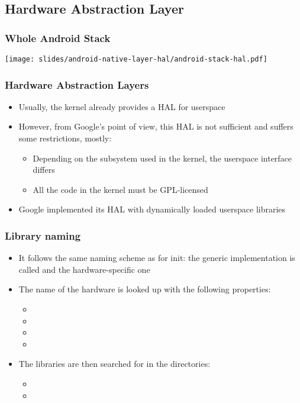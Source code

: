 \subsection{Hardware Abstraction Layer}

\begin{frame}
  \frametitle{Whole Android Stack}
  \begin{center}
    \texttt{[image: slides/android-native-layer-hal/android-stack-hal.pdf]}
  \end{center}
\end{frame}

\begin{frame}
  \frametitle{Hardware Abstraction Layers}
  \begin{itemize}
  \item Usually, the kernel already provides a HAL for userspace
  \item However, from Google's point of view, this HAL is not sufficient and
    suffers some restrictions, mostly:
    \begin{itemize}
    \item Depending on the subsystem used in the kernel, the userspace
      interface differs
    \item All the code in the kernel must be GPL-licensed
    \end{itemize}
  \item Google implemented its HAL with dynamically loaded userspace libraries
  \end{itemize}
\end{frame}

\begin{frame}
  \frametitle{Library naming}
  \begin{itemize}
  \item It follows the same naming scheme as for init: the generic
    implementation is called  and the hardware-specific
    one 
  \item The name of the hardware is looked up with the following properties:
    \begin{itemize}
    \item {}
    \item {}
    \item {}
    \item {}
    \end{itemize}
  \item The libraries are then searched for in the directories:
    \begin{itemize}
    \item {}
    \item {}
    \end{itemize}
  \end{itemize}
\end{frame}

